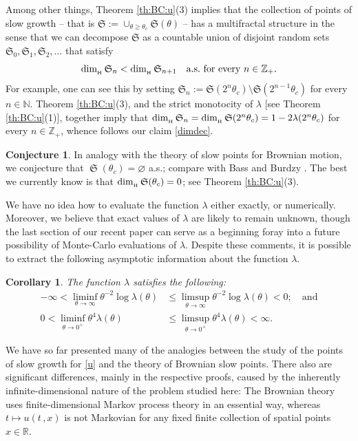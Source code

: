 \documentclass[reqno]{amsart}
\DeclareMathOperator{\dimh}{dim_{_{\rm H}}}
\DeclareMathOperator{\fS}{\mathfrak S}
\newcommand{\<}{\langle}
\renewcommand{\>}{\rangle}
\newcommand{\N}{\mathbb{N}}
\newcommand{\Z}{\mathbb{Z}}
\newcommand{\R}{\mathbb{R}}
\newcommand{\1}{\mathbb{1}}
\renewcommand{\ge}{\geqslant}
\renewcommand{\le}{\leqslant}
\newtheorem{corollary}[stat]{Corollary}
\theoremstyle{definition}
\newtheorem{conjecture}[stat]{Conjecture}
\numberwithin{equation}{section}
\begin{document}
Among other things, Theorem \ref{th:BC:u}(3)
implies that the collection of points of slow growth -- that  is
$\mathfrak{S} := \cup_{\theta\ge\theta_c}\mathfrak{S}(\theta)$ --
has a multifractal structure in the sense that we can decompose $\mathfrak{S}$
as a countable union of disjoint
random sets $\mathfrak{S}_0,\mathfrak{S}_1,\mathfrak{S}_2,\ldots$ that satisfy
\begin{equation}\label{dimdec}
	\dimh \mathfrak{S}_n < \dimh \mathfrak{S}_{n+1}
	\quad\text{a.s.\ for every $n\in\Z_+$.}
\end{equation}
For example, one can see this by setting
$\mathfrak{S}_n := \mathfrak{S}(2^n\theta_c)\setminus \mathfrak{S}(2^{n-1}\theta_c)$
for every $n\in\N.$
Theorem \ref{th:BC:u}(3), and the strict monotocity of $\lambda$
[see Theorem \ref{th:BC:u}(1)], together imply that $\dimh \mathfrak{S}_n
=\dimh \mathfrak{S}(2^n\theta_c) = 1 - 2\lambda(2^n\theta_c)$ for
every $n\in\Z_+$,
whence follows our claim \eqref{dimdec}.


\begin{conjecture}
	In analogy with the theory of slow points for Brownian motion,
	we conjecture
	that $\fS(\theta_c)=\varnothing$ a.s.; compare
	with Bass and Burdzy \cite{BassBurdzy}. The best we currently know
	is that $\dimh\mathfrak{S}(\theta_c)=0$; see Theorem \ref{th:BC:u}(3).
\end{conjecture}

We have no idea how to evaluate the function $\lambda$ either exactly,
or numerically. Moreover, we believe that exact values of $\lambda$ are likely to
remain unknown, though  the last section of our recent paper
\cite{KL} can serve as
a beginning foray into a future possibility of Monte-Carlo evaluations of $\lambda$.
Despite these comments, it is possible to extract the following asymptotic information about the function
$\lambda$.

\begin{corollary}\label{cor:lambda}
	The function $\lambda$ satisfies the following:
	\begin{align*}
		-\infty< \liminf_{\theta\to\infty} \theta^{-2}\log\lambda(\theta)
			&\le \limsup_{\theta\to\infty} \theta^{-2}\log\lambda(\theta)<0;
			\quad\text{and}\\
		0<\liminf_{\theta\to0^+} \theta^{4}\lambda(\theta)
			&\le\limsup_{\theta\to0^+}\theta^{4}\lambda(\theta)<\infty.
	\end{align*}
\end{corollary}

We have so far presented many of the analogies between the study of the points
of slow growth for \eqref{u} and the theory of Brownian slow points. There
also are significant differences, mainly in the respective proofs, caused by
the inherently infinite-dimensional nature of the problem studied here:
The Brownian theory uses finite-dimensional Markov process theory in an 
essential way, whereas $t\mapsto u(t\,,x)$ is not Markovian for any fixed finite collection of
spatial points $x\in\R$.
\end{document}
